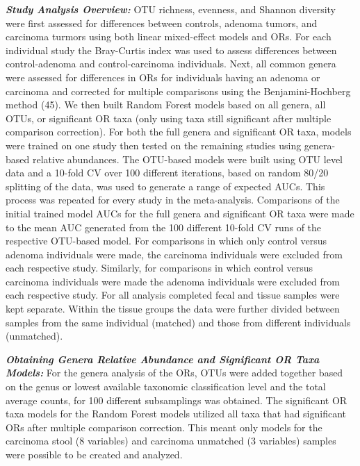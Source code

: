 \documentclass[12pt,]{article}
\begin{document}
\textbf{\emph{Study Analysis Overview:}} OTU richness, evenness, and
Shannon diversity were first assessed for differences between controls,
adenoma tumors, and carcinoma turmors using both linear mixed-effect
models and ORs. For each individual study the Bray-Curtis index was used
to assess differences between control-adenoma and control-carcinoma
individuals. Next, all common genera were assessed for differences in
ORs for individuals having an adenoma or carcinoma and corrected for
multiple comparisons using the Benjamini-Hochberg method (45). We then
built Random Forest models based on all genera, all OTUs, or significant
OR taxa (only using taxa still significant after multiple comparison
correction). For both the full genera and significant OR taxa, models
were trained on one study then tested on the remaining studies using
genera-based relative abundances. The OTU-based models were built using
OTU level data and a 10-fold CV over 100 different iterations, based on
random 80/20 splitting of the data, was used to generate a range of
expected AUCs. This process was repeated for every study in the
meta-analysis. Comparisons of the initial trained model AUCs for the
full genera and significant OR taxa were made to the mean AUC generated
from the 100 different 10-fold CV runs of the respective OTU-based
model. For comparisons in which only control versus adenoma individuals
were made, the carcinoma individuals were excluded from each respective
study. Similarly, for comparisons in which control versus carcinoma
individuals were made the adenoma individuals were excluded from each
respective study. For all analysis completed fecal and tissue samples
were kept separate. Within the tissue groups the data were further
divided between samples from the same individual (matched) and those
from different individuals (unmatched).

\textbf{\emph{Obtaining Genera Relative Abundance and Significant OR
Taxa Models:}} For the genera analysis of the ORs, OTUs were added
together based on the genus or lowest available taxonomic classification
level and the total average counts, for 100 different subsamplings was
obtained. The significant OR taxa models for the Random Forest models
utilized all taxa that had significant ORs after multiple comparison
correction. This meant only models for the carcinoma stool (8 variables)
and carcinoma unmatched (3 variables) samples were possible to be
created and analyzed.
\end{document}
